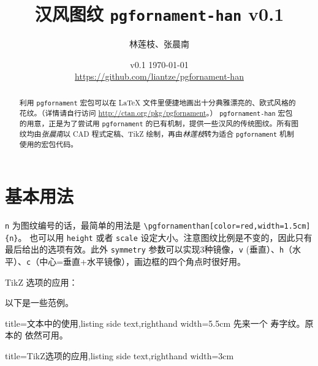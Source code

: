 \documentclass{ctexart}
\title{汉风图纹 \texttt{pgfornament-han} v0.1}
\author{林莲枝、张晨南}
\date{v0.1 \today\\\url{https://github.com/liantze/pgfornament-han}}
\newcommand{\latexinline}[1]{\lstinline|#1|}
\begin{document}
\maketitle

\begin{abstract}
利用 \texttt{pgfornament} 宏包可以在 \LaTeX{} 文件里便捷地画出十分典雅漂亮的、欧式风格的花纹。（详情请自行访问 \url{http://ctan.org/pkg/pgfornament}。）
\texttt{pgfornament-han} 宏包的用意，正是为了尝试用 \texttt{pgfornament} 的已有机制，提供一些汉风的传统图纹。所有图纹均由\emph{张晨南}以 CAD 程式定稿、TikZ 绘制，再由\emph{林莲枝}转为适合 \texttt{pgfornament} 机制使用的宏包代码。
\end{abstract}


\part{基本用法}

\texttt{n} 为图纹编号的话，最简单的用法是 \latexinline{\pgfornamenthan[color=red,width=1.5cm]{n}}。
也可以用 \texttt{height} 或者 \texttt{scale} 设定大小。注意图纹比例是不变的，因此只有最后给出的选项有效。此外 \texttt{symmetry} 参数可以实现3种镜像，\texttt{v} (垂直）、\texttt{h}（水平）、\texttt{c}（中心=垂直+水平镜像），画边框的四个角点时很好用。

TikZ 选项的应用：

\begin{latexcode}
\end{latexcode}

以下是一些范例。

\bigskip

\begin{tcblisting}{title={文本中的使用},listing side text,righthand width=5.5cm}
先来一个 
寿字纹。原本的  依然可用。
\end{tcblisting}

\begin{tcblisting}{title={TikZ选项的应用},listing side text,righthand width=3cm}
\end{tcblisting}
\end{document}
